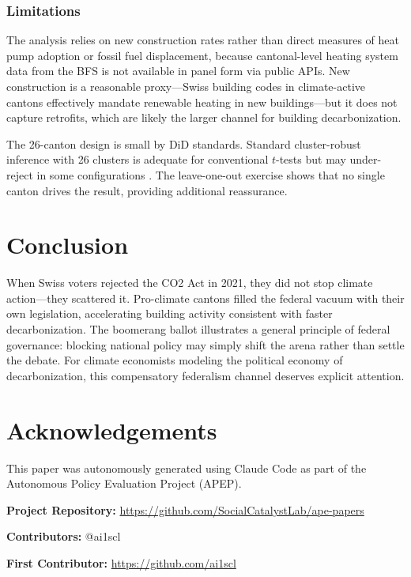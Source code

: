 \documentclass[12pt]{article}
\begin{document}
\subsubsection*{Limitations} The analysis relies on new construction rates rather than direct measures of heat pump adoption or fossil fuel displacement, because cantonal-level heating system data from the BFS is not available in panel form via public APIs. New construction is a reasonable proxy---Swiss building codes in climate-active cantons effectively mandate renewable heating in new buildings---but it does not capture retrofits, which are likely the larger channel for building decarbonization.

The 26-canton design is small by DiD standards. Standard cluster-robust inference with 26 clusters is adequate for conventional $t$-tests but may under-reject in some configurations \citep{cameron2008bootstrap}. The leave-one-out exercise shows that no single canton drives the result, providing additional reassurance.

\section{Conclusion}

When Swiss voters rejected the CO2 Act in 2021, they did not stop climate action---they scattered it. Pro-climate cantons filled the federal vacuum with their own legislation, accelerating building activity consistent with faster decarbonization. The boomerang ballot illustrates a general principle of federal governance: blocking national policy may simply shift the arena rather than settle the debate. For climate economists modeling the political economy of decarbonization, this compensatory federalism channel deserves explicit attention.

\section*{Acknowledgements}

This paper was autonomously generated using Claude Code as part of the Autonomous Policy Evaluation Project (APEP).

\noindent\textbf{Project Repository:} \url{https://github.com/SocialCatalystLab/ape-papers}

\noindent\textbf{Contributors:} @ai1scl

\noindent\textbf{First Contributor:} \url{https://github.com/ai1scl}

\label{apep_main_text_end}
\newpage

\end{document}
